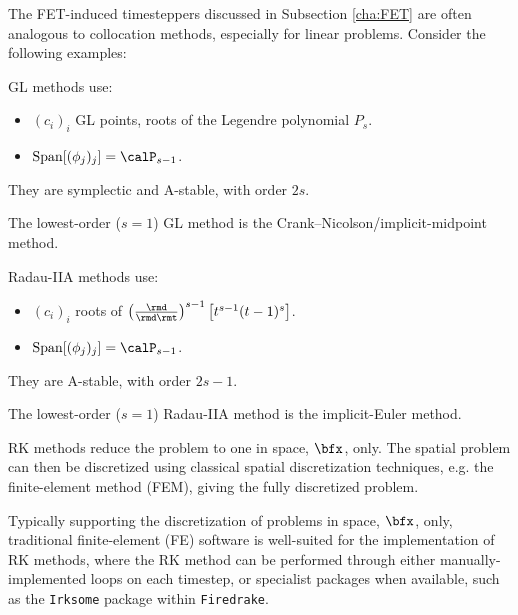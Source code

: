     The FET-induced timesteppers discussed in Subsection \ref{cha:FET} are often analogous to collocation methods, especially for linear problems. Consider the following examples:

    \begin{example}
        GL methods use:
        \begin{itemize}
            \item  $(c_{i})_{i}$ GL points, roots of the Legendre polynomial $P_{s}$.
            \item  ${\rm Span}[(\phi_{j})_{j}]  =  \calP_{s - 1}$.
        \end{itemize}
        They are symplectic \cite{Lasagni_1988, Sanz--Serna_1988} and A-stable, with order $2s$.

        The lowest-order ($s  =  1$) GL method is the Crank--Nicolson/implicit-midpoint method.
    \end{example}

    \begin{example}
        Radau-IIA methods use:
        \begin{itemize}
            \item  $(c_{i})_{i}$ roots of $\left(\frac{\rmd}{\rmd\rmt}\right)^{s - 1}\left[t^{s - 1}(t - 1)^{s}\right]$.
            \item  ${\rm Span}[(\phi_{j})_{j}]  =  \calP_{s - 1}$.
        \end{itemize}
        They are A-stable, with order $2s - 1$.

        The lowest-order ($s  =  1$) Radau-IIA method is the implicit-Euler method.
    \end{example}
    
    \line
    
    RK methods reduce the problem to one in space, $\bfx$, only. The spatial problem can then be discretized using classical spatial discretization techniques, e.g. the finite-element method (FEM), giving the fully discretized problem.
    
    Typically supporting the discretization of problems in space, $\bfx$, only, traditional finite-element (FE) software is well-suited for the implementation of RK methods, where the RK method can be performed through either manually-implemented loops on each timestep, or specialist packages when available, such as the \texttt{Irksome} package within \texttt{Firedrake}. \cite{Farrell_Kirby_Marchena-Menéndez_2021}

